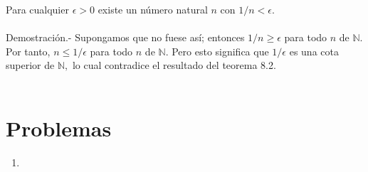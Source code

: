\begin{teo}
    Para cualquier $\epsilon>0$ existe un número natural $n$ con $1/n<\epsilon$.\\\\
    Demostración.-\; Supongamos que no fuese así; entonces $1/n\geq \epsilon$ para todo $n$ de $\mathbb{N}$. Por tanto, $n\leq 1/\epsilon$ para todo $n$ de $\mathbb{N}.$ Pero esto significa que $1/\epsilon$ es una cota superior de $\mathbb{N},$ lo cual contradice el resultado del teorema 8.2.\\\\
\end{teo}


\section{Problemas}

\begin{enumerate}[\bfseries 1.]

    \item 

\end{enumerate}

